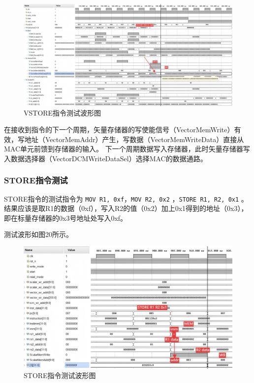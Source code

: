 \documentclass[UTF8]{ctexart}
\begin{document}
\begin{figure}[htbp]
    \centering
    \includegraphics[width=16cm]{pic/VPU_VSTORE(1).png}
    \caption{VSTORE指令测试波形图}
\end{figure}

在接收到指令的下一个周期，矢量存储器的写使能信号（VectorMemWrite）有效，写地址（VectorMemAddr）产生，写数据（VectorMemWriteData）直接从MAC单元前馈到存储器的输入。
下一个周期数据写入存储器，此时矢量存储器写入数据选择器（VectorDCMWriteDataSel）选择MAC的数据通路。

\subsubsection{STORE指令测试}

STORE指令的测试指令为 \verb|MOV R1, 0xf|，\verb|MOV R2, 0x2| ，\verb|STORE R1, R2, 0x1| 。
结果应该是取R1的数据（0xf），写入R2的值（0x2）加上0x1得到的地址（0x3），即在标量存储器的0x3号地址处写入0xf。

测试波形如图20所示。

\begin{figure}[htbp]
    \centering
    \includegraphics[width=16cm]{pic/VPU_STORE(1).png}
    \caption{STORE指令测试波形图}
\end{figure}
\end{document}
